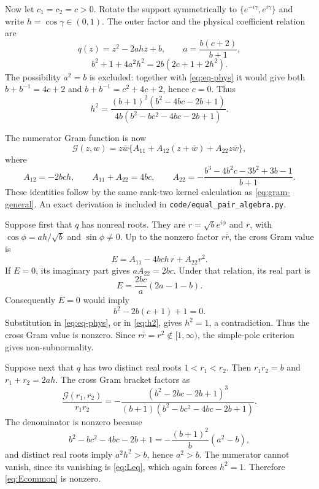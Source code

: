 \documentclass[11pt]{article}
\newcommand{\G}{\mathcal G}
\begin{document}
Now let $c_1=c_2=c>0$.  Rotate the support symmetrically to
$\{e^{-i\gamma},e^{i\gamma}\}$ and write $h=\cos\gamma\in(0,1)$.  The
outer factor and the physical coefficient relation are
\begin{equation}\label{eq:eq-q}
 q(z)=z^2-2ahz+b,\qquad a=\frac{b(c+2)}{b+1},
\end{equation}
\begin{equation}\label{eq:eq-phys}
 b^2+1+4a^2h^2=2b(2c+1+2h^2).
\end{equation}
The possibility $a^2=b$ is excluded: together with
\eqref{eq:eq-phys} it would give both
$b+b^{-1}=4c+2$ and $b+b^{-1}=c^2+4c+2$, hence $c=0$.
Thus
\begin{equation}\label{eq:h2}
 h^2=\frac{(b+1)^2(b^2-4bc-2b+1)}
 {4b(b^2-bc^2-4bc-2b+1)}.
\end{equation}

The numerator Gram function is now
\begin{equation}\label{eq:equal-gram}
 \G(z,w)=z\overline w\{A_{11}+A_{12}(z+\overline w)
 +A_{22}z\overline w\},
\end{equation}
where
\begin{equation}\label{eq:Aequal}
 A_{12}=-2bch,\qquad A_{11}+A_{22}=4bc,\qquad
 A_{22}=-\frac{b^3-4b^2c-3b^2+3b-1}{b+1}.
\end{equation}
These identities follow by the same rank-two kernel calculation as
\eqref{eq:gram-general}.  An exact derivation is included in
\texttt{code/equal\_pair\_algebra.py}.

Suppose first that $q$ has nonreal roots.  They are
$r=\sqrt b e^{i\phi}$ and $\overline r$, with
$\cos\phi=ah/\sqrt b$ and $\sin\phi\ne0$.  Up to the nonzero factor
$r\overline{\overline r}$, the cross Gram value is
\begin{equation}\label{eq:Econj}
 E=A_{11}-4bch\,r+A_{22}r^2.
\end{equation}
If $E=0$, its imaginary part gives $aA_{22}=2bc$.  Under that relation,
its real part is
\[
 E=\frac{2bc}{a}(2a-1-b).
\]
Consequently $E=0$ would imply
\begin{equation}\label{eq:Leq}
 b^2-2b(c+1)+1=0.
\end{equation}
Substitution in \eqref{eq:eq-phys}, or in \eqref{eq:h2}, gives $h^2=1$,
a contradiction.  Thus the cross Gram value is nonzero.  Since
$r\overline{\overline r}=r^2\notin[1,\infty)$, the simple-pole criterion
gives non-subnormality.

Suppose next that $q$ has two distinct real roots $1<r_1<r_2$.  Then
$r_1r_2=b$ and $r_1+r_2=2ah$.  The cross Gram bracket factors as
\begin{equation}\label{eq:Ecommon}
 \frac{\G(r_1,r_2)}{r_1r_2}
 =-\frac{(b^2-2bc-2b+1)^3}
 {(b+1)(b^2-bc^2-4bc-2b+1)}.
\end{equation}
The denominator is nonzero because
\[
 b^2-bc^2-4bc-2b+1=-\frac{(b+1)^2}{b}(a^2-b),
\]
and distinct real roots imply $a^2h^2>b$, hence $a^2>b$.  The numerator
cannot vanish, since its vanishing is \eqref{eq:Leq}, which again forces
$h^2=1$.  Therefore \eqref{eq:Ecommon} is nonzero.
\end{document}
